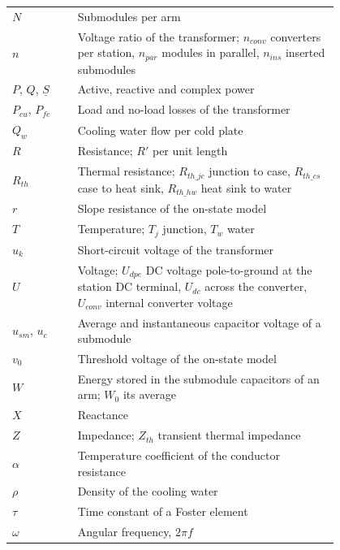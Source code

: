\begin{longtable}{@{}l p{0.80\linewidth}@{}}
  $N$        & Submodules per arm \\
  $n$        & Voltage ratio of the transformer; $n_{conv}$ converters per station, $n_{par}$ modules in parallel,
               $n_{ins}$ inserted submodules \\
  $P$, $Q$, $\underline{S}$ & Active, reactive and complex power \\
  $P_{cu}$, $P_{fe}$ & Load and no-load losses of the transformer \\
  $Q_w$      & Cooling water flow per cold plate \\
  $R$        & Resistance; $R'$ per unit length \\
  $R_{th}$   & Thermal resistance; $R_{th\_jc}$ junction to case, $R_{th\_cs}$ case to heat sink, $R_{th\_hw}$ heat
               sink to water \\
  $r$        & Slope resistance of the on-state model \\
  $T$        & Temperature; $T_j$ junction, $T_w$ water \\
  $u_k$      & Short-circuit voltage of the transformer \\
  $U$        & Voltage; $U_{dpe}$ DC voltage pole-to-ground at the station DC terminal, $U_{dc}$ across the
               converter, $U_{conv}$ internal converter voltage \\
  $u_{sm}$, $u_c$ & Average and instantaneous capacitor voltage of a submodule \\
  $v_0$      & Threshold voltage of the on-state model \\
  $W$        & Energy stored in the submodule capacitors of an arm; $W_0$ its average \\
  $X$        & Reactance \\
  $Z$        & Impedance; $Z_{th}$ transient thermal impedance \\
  $\alpha$   & Temperature coefficient of the conductor resistance \\
  $\rho$     & Density of the cooling water \\
  $\tau$     & Time constant of a Foster element \\
  $\omega$   & Angular frequency, $2 \pi f$ \\
  \bottomrule
\end{longtable}
